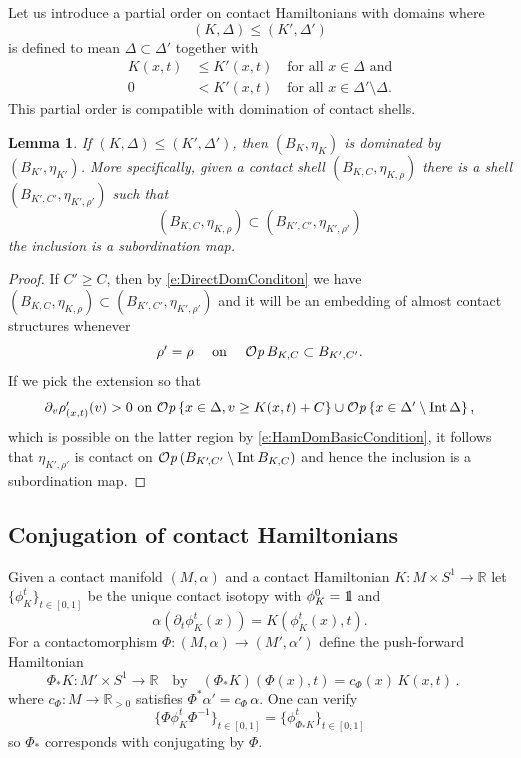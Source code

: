 \documentclass[12pt]{paper}
\theoremstyle{plain}
\newtheorem{lemma}[theorem]{Lemma}
\theoremstyle{definition}
\newcommand{\id}{{{\mathchoice {\rm 1\mskip-4mu l} {\rm 1\mskip-4mu l}
{\rm 1\mskip-4.5mu l} {\rm 1\mskip-5mu l}}}}
\newcommand{\p}{\partial}
\newcommand{\R}{{\mathbb{R}}}
\newcommand{\Int}{{\rm Int\,}} %
\def\Op{{\mathcal O}{\it p}\,}
\numberwithin{figure}{section}
\begin{document}
Let us introduce a partial order on contact Hamiltonians with domains where 
$$(K, \Delta) \leq (K', \Delta')$$
is defined to mean $\Delta \subset \Delta'$ together with
\begin{align}
	K(x,t) &\leq K'(x,t) \quad\mbox{for all $x \in \Delta$ and} \label{e:DirectDomConditon}\\
	0 &< K'(x,t) \quad\mbox{for all $x \in \Delta' \setminus \Delta$.} \label{e:HamDomBasicCondition}
\end{align}
This partial order is compatible with domination of contact shells.
 \begin{lemma}\label{l:HamiltonianShellsAnnulus}
	If $(K, \Delta) \leq (K', \Delta')$, then $(B_{K}, \eta_{K})$ is dominated by
	$(B_{K'}, \eta_{K'})$.  More specifically, given a contact shell $(B_{K,C}, \eta_{K, \rho})$ there is a shell
	$(B_{K'\!,C'}, \eta_{K'\!, \rho'})$ such that 
	$$(B_{K,C}, \eta_{K, \rho}) \subset (B_{K'\!,C'}, \eta_{K'\!, \rho'})$$ 
	the inclusion is a subordination map.
\end{lemma}
\begin{proof}
	If $C' \geq C$, then by \eqref{e:DirectDomConditon} we have
	$(B_{K,C}, \eta_{K,\rho}) \subset (B_{K'\!,C'}, \eta_{K'\!,\rho'})$
	and it will be an embedding of almost contact structures whenever
	$$
	\mbox{$\rho' = \rho$ \quad on \quad $\Op B_{K,C} \subset B_{K',C'}$.}
	$$
	If we pick the extension so that
$$		
		\mbox{$\p_v \rho'_{(x,t)}(v) > 0$ on $\Op\{x \in \Delta, v \geq K(x,t) +C\} \cup \Op\{x \in \Delta' \setminus \Int \Delta\}$\,,}
$$
	which is possible on the latter region by \eqref{e:HamDomBasicCondition}, it follows that 
	$\eta_{K'\!,\rho'}$ is contact on $\Op (B_{K'\!,C'} \setminus \Int B_{K,C})$
	and hence the inclusion is a subordination map.
\end{proof}


\subsection{Conjugation of contact Hamiltonians}\label{sec:effect}

Given a contact manifold $(M, \alpha)$ and a contact Hamiltonian 
$K: M \times S^1 \to \R$ let $\{\phi^t_K\}_{t \in [0,1]}$ be the unique contact isotopy with $\phi^0_K = \id$ and
$$\alpha(\p_t \phi^t_K(x)) = K(\phi^t_K(x), t).$$
For a contactomorphism $\Phi : (M, \alpha) \to (M', \alpha')$ define the push-forward Hamiltonian
\begin{equation}\label{e:ContPushK}
	\Phi_*K: M' \times S^1 \to \R \quad\mbox{by}\quad (\Phi_*K)(\Phi(x),t) = c_{\Phi}(x)\,K(x,t)\,. \quad
\end{equation}
where $c_\Phi: M \to \R_{> 0}$ satisfies $\Phi^*\alpha' = c_\Phi\, \alpha$.
One can verify
$$
	\{\Phi \phi^t_K \Phi^{-1}\}_{t \in [0,1]} = \{\phi^t_{\Phi_*K}\}_{t \in [0,1]}
$$
so $\Phi_*$ corresponds with conjugating by $\Phi$.
\end{document}
